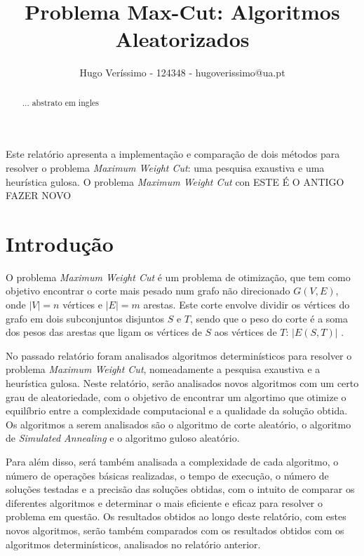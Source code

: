 \documentclass[mirror, portugues]{revdetua}
\begin{document}

\title{Problema Max-Cut: Algoritmos Aleatorizados}
\author{Hugo Veríssimo - 124348 - hugoverissimo@ua.pt}
\maketitle

\begin{abstract}
... abstrato em ingles
\end{abstract}

\begin{resumo}
Este relatório apresenta a implementação e comparação de dois métodos para resolver o problema \textit{Maximum Weight Cut}: uma pesquisa exaustiva e uma heurística gulosa. O problema \textit{Maximum Weight Cut} con ESTE É O ANTIGO FAZER NOVO
\end{resumo}

\section{Introdução}

O problema \textit{Maximum Weight Cut} é um problema de otimização, que tem como objetivo encontrar o corte mais pesado num grafo não direcionado $G(V,E)$, onde $|V| = n$ vértices e $|E| = m$ arestas. Este corte envolve dividir os vértices do grafo em dois subconjuntos disjuntos $S$ e $T$, sendo que o peso do corte é a soma dos pesos das arestas que ligam os vértices de $S$ aos vértices de $T$: $|E(S, T)|$ \cite{AG14}.

No passado relatório foram analisados algoritmos determinísticos para resolver o problema \textit{Maximum Weight Cut}, nomeadamente a pesquisa exaustiva e a heurística gulosa. Neste relatório, serão analisados novos algoritmos com um certo grau de aleatoriedade, com o objetivo de encontrar um algortimo que otimize o equilíbrio entre a complexidade computacional e a qualidade da solução obtida. Os algoritmos a serem analisados são o algoritmo de corte aleatório, o algoritmo de \textit{Simulated Annealing} e o algoritmo guloso aleatório.

Para além disso, será também analisada a complexidade de cada algoritmo, o número de operações básicas realizadas, o tempo de execução, o número de soluções testadas e a precisão das soluções obtidas, com o intuito de comparar os diferentes algoritmos e determinar o mais eficiente e eficaz para resolver o problema em questão. Os resultados obtidos ao longo deste relatório, com estes novos algoritmos, serão também comparados com os resultados obtidos com os algoritmos determinísticos, analisados no relatório anterior.
\end{document}
